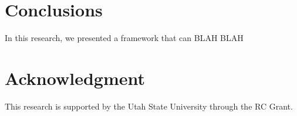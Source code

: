 \documentclass[conference]{IEEEtran}
\begin{document}
\section{Conclusions}
\label{sec:conc}
In this research, we presented a framework that can BLAH BLAH

\section*{Acknowledgment}
This research is supported by the Utah State University through the RC Grant.



\end{document}
